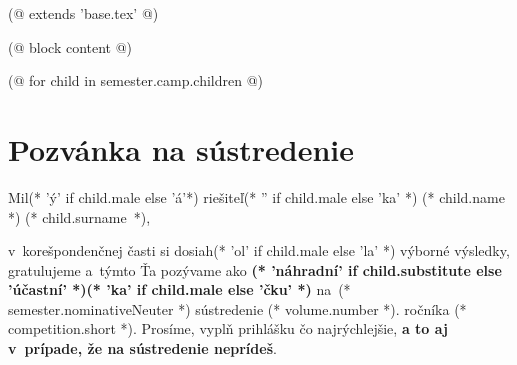 (@ extends 'base.tex' @)
 
(@ block content @)
    \pagestyle{seminar-main-(* competition.id *)}
    
    (@ for child in semester.camp.children @)
        \thispagestyle{seminar-first-(* competition.id *)-(* volume.id *)-(* semester.id *)}
        \vspace*{8mm}
        \section{Pozvánka na sústredenie}
            Mil(* 'ý' if child.male else 'á'*) riešiteľ(* '' if child.male else 'ka' *) (* child.name *) (* child.surname *),

            v~korešpondenčnej časti si dosiah(* 'ol' if child.male else 'la' *) výborné výsledky,
            gratulujeme a~týmto Ťa pozývame ako \textbf{(* 'náhradní' if child.substitute else 'účastní' *)(* 'ka' if child.male else 'čku' *)}
            na~(* semester.nominativeNeuter *) sústredenie (* volume.number *). ročníka (* competition.short *).
            Prosíme, vyplň prihlášku čo najrýchlejšie, \textbf{a to aj v~prípade, že na sústredenie neprídeš}.

